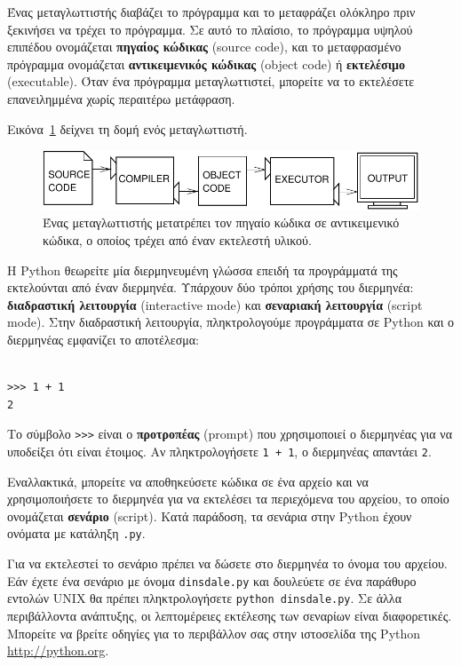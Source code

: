 \documentclass[10pt]{book}
\begin{document}
Ένας μεταγλωττιστής διαβάζει το πρόγραμμα και το μεταφράζει ολόκληρο
πριν ξεκινήσει να τρέχει το πρόγραμμα.  Σε αυτό το πλαίσιο, το
πρόγραμμα υψηλού επιπέδου ονομάζεται {\bf πηγαίος κώδικας} (source code), και το μεταφρασμένο πρόγραμμα ονομάζεται {\bf αντικειμενικός κώδικας} (object code) ή {\bf εκτελέσιμο} (executable). Όταν ένα πρόγραμμα μεταγλωττιστεί, μπορείτε να το εκτελέσετε επανειλημμένα χωρίς περαιτέρω μετάφραση.

Εικόνα~\ref{fig.compile} δείχνει τη δομή ενός μεταγλωττιστή.

\begin{figure}
\centerline
{\includegraphics[scale=0.9]{figs/compile.pdf}}
\caption{Ένας μεταγλωττιστής μετατρέπει τον πηγαίο κώδικα σε αντικειμενικό κώδικα, ο οποίος τρέχει από έναν εκτελεστή υλικού.}
\label{fig.compile}
\end{figure}

Η Python θεωρείτε μία διερμηνευμένη γλώσσα επειδή τα προγράμματά της
εκτελούνται από έναν διερμηνέα. Υπάρχουν δύο τρόποι χρήσης του διερμηνέα: {\bf διαδραστική λειτουργία} (interactive mode) και {\bf σεναριακή λειτουργία} (script mode). Στην διαδραστική λειτουργία, πληκτρολογούμε προγράμματα σε Python και ο διερμηνέας εμφανίζει το αποτέλεσμα:


\begin{verbatim}

>>> 1 + 1
2
\end{verbatim}
%
Το σύμβολο \verb">>>" είναι ο {\bf προτροπέας} (prompt) που χρησιμοποιεί ο διερμηνέας για να υποδείξει ότι είναι έτοιμος. Αν πληκτρολογήσετε {\tt 1 + 1}, ο διερμηνέας απαντάει {\tt 2}.

Εναλλακτικά, μπορείτε να αποθηκεύσετε κώδικα σε ένα αρχείο και να χρησιμοποιήσετε το διερμηνέα για να εκτελέσει τα περιεχόμενα του αρχείου, το οποίο ονομάζεται {\bf σενάριο} (script). Κατά παράδοση, τα σενάρια στην Python έχουν ονόματα με κατάληξη {\tt .py}.

Για να εκτελεστεί το σενάριο πρέπει να δώσετε στο διερμηνέα το όνομα
του αρχείου. Εάν έχετε ένα σενάριο με όνομα {\tt dinsdale.py} και δουλεύετε σε ένα παράθυρο εντολών UNIX θα πρέπει πληκτρολογήσετε {\tt python dinsdale.py}.  Σε άλλα περιβάλλοντα ανάπτυξης, οι λεπτομέρειες εκτέλεσης των σεναρίων είναι διαφορετικές. Μπορείτε να βρείτε οδηγίες για το περιβάλλον σας στην ιστοσελίδα της Python \url{http://python.org}.
\end{document}
